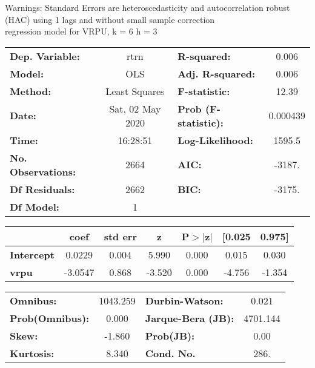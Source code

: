 Warnings: \newline
 [1] Standard Errors are heteroscedasticity and autocorrelation robust (HAC) using 1 lags and without small sample correction\\ 

regression model for VRPU, k = 6 h = 3\begin{center}
\begin{tabular}{lclc}
\toprule
\textbf{Dep. Variable:}    &       rtrn       & \textbf{  R-squared:         } &     0.006   \\
\textbf{Model:}            &       OLS        & \textbf{  Adj. R-squared:    } &     0.006   \\
\textbf{Method:}           &  Least Squares   & \textbf{  F-statistic:       } &     12.39   \\
\textbf{Date:}             & Sat, 02 May 2020 & \textbf{  Prob (F-statistic):} &  0.000439   \\
\textbf{Time:}             &     16:28:51     & \textbf{  Log-Likelihood:    } &    1595.5   \\
\textbf{No. Observations:} &        2664      & \textbf{  AIC:               } &    -3187.   \\
\textbf{Df Residuals:}     &        2662      & \textbf{  BIC:               } &    -3175.   \\
\textbf{Df Model:}         &           1      & \textbf{                     } &             \\
\bottomrule
\end{tabular}
\begin{tabular}{lcccccc}
                   & \textbf{coef} & \textbf{std err} & \textbf{z} & \textbf{P$> |$z$|$} & \textbf{[0.025} & \textbf{0.975]}  \\
\midrule
\textbf{Intercept} &       0.0229  &        0.004     &     5.990  &         0.000        &        0.015    &        0.030     \\
\textbf{vrpu}      &      -3.0547  &        0.868     &    -3.520  &         0.000        &       -4.756    &       -1.354     \\
\bottomrule
\end{tabular}
\begin{tabular}{lclc}
\textbf{Omnibus:}       & 1043.259 & \textbf{  Durbin-Watson:     } &    0.021  \\
\textbf{Prob(Omnibus):} &   0.000  & \textbf{  Jarque-Bera (JB):  } & 4701.144  \\
\textbf{Skew:}          &  -1.860  & \textbf{  Prob(JB):          } &     0.00  \\
\textbf{Kurtosis:}      &   8.340  & \textbf{  Cond. No.          } &     286.  \\
\bottomrule
\end{tabular}
\end{center}

